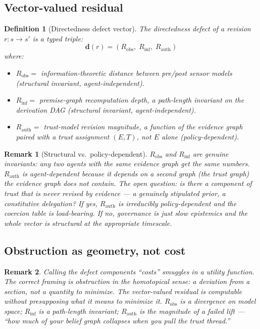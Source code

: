 \documentclass[11pt]{article}
\newtheorem{definition}{Definition}
\newtheorem{remark}{Remark}
\newcommand{\Robs}{R_{\mathrm{obs}}}
\newcommand{\Rinf}{R_{\mathrm{inf}}}
\newcommand{\Rauth}{R_{\mathrm{auth}}}
\begin{document}
\subsection{Vector-valued residual}

\begin{definition}[Directedness defect vector]
\label{def:defect-vector}
The directedness defect of a revision $r : s \to s'$ is a typed triple:
\[
\mathbf{d}(r) = (\Robs,\; \Rinf,\; \Rauth)
\]
where:
\begin{itemize}
  \item $\Robs = $ information-theoretic distance between pre/post sensor models
        (structural invariant, agent-independent).
  \item $\Rinf = $ premise-graph recomputation depth, a path-length invariant on the
        derivation DAG (structural invariant, agent-independent).
  \item $\Rauth = $ trust-model revision magnitude, a function of the evidence graph paired
        with a trust assignment $(E, T)$, not $E$ alone (policy-dependent).
\end{itemize}
\end{definition}

\begin{remark}[Structural vs.\ policy-dependent]
$\Robs$ and $\Rinf$ are genuine invariants: any two agents with the same evidence graph get the
same numbers. $\Rauth$ is agent-dependent because it depends on a second graph (the trust graph)
the evidence graph does not contain. The open question: is there a component of trust that is
never revised by evidence --- a genuinely stipulated prior, a constitutive delegation? If yes,
$\Rauth$ is irreducibly policy-dependent and the coercion table is load-bearing. If no,
governance is just slow epistemics and the whole vector is structural at the appropriate
timescale.
\end{remark}

\subsection{Obstruction as geometry, not cost}

\begin{remark}
Calling the defect components ``costs'' smuggles in a utility function. The correct framing is
\emph{obstruction in the homotopical sense}: a deviation from a section, not a quantity to
minimize. The vector-valued residual is computable without presupposing what it means to minimize
it. $\Robs$ is a divergence on model space; $\Rinf$ is a path-length invariant; $\Rauth$ is the
magnitude of a failed lift --- ``how much of your belief graph collapses when you pull the trust
thread.''
\end{remark}
\end{document}
